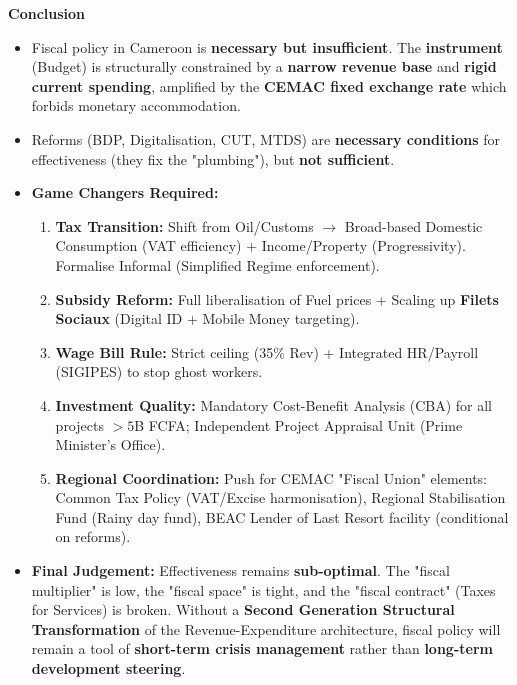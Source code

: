 \documentclass[11pt]{article}
\begin{document}
\begin{exoresolu}
\textbf{Conclusion}
\begin{itemize}
    \item Fiscal policy in Cameroon is \textbf{necessary but insufficient}. The \textbf{instrument} (Budget) is structurally constrained by a \textbf{narrow revenue base} and \textbf{rigid current spending}, amplified by the \textbf{CEMAC fixed exchange rate} which forbids monetary accommodation.
    \item Reforms (BDP, Digitalisation, CUT, MTDS) are \textbf{necessary conditions} for effectiveness (they fix the "plumbing"), but \textbf{not sufficient}. 
    \item \textbf{Game Changers Required:} 
    \begin{enumerate}
        \item \textbf{Tax Transition:} Shift from Oil/Customs $\rightarrow$ Broad-based Domestic Consumption (VAT efficiency) + Income/Property (Progressivity). Formalise Informal (Simplified Regime enforcement).
        \item \textbf{Subsidy Reform:} Full liberalisation of Fuel prices + Scaling up \textbf{Filets Sociaux} (Digital ID + Mobile Money targeting).
        \item \textbf{Wage Bill Rule:} Strict ceiling (35\% Rev) + Integrated HR/Payroll (SIGIPES) to stop ghost workers.
        \item \textbf{Investment Quality:} Mandatory Cost-Benefit Analysis (CBA) for all projects $> 5$B FCFA; Independent Project Appraisal Unit (Prime Minister's Office).
        \item \textbf{Regional Coordination:} Push for CEMAC "Fiscal Union" elements: Common Tax Policy (VAT/Excise harmonisation), Regional Stabilisation Fund (Rainy day fund), BEAC Lender of Last Resort facility (conditional on reforms).
    \end{enumerate}
    \item \textbf{Final Judgement:} Effectiveness remains \textbf{sub-optimal}. The "fiscal multiplier" is low, the "fiscal space" is tight, and the "fiscal contract" (Taxes for Services) is broken. Without a \textbf{Second Generation Structural Transformation} of the Revenue-Expenditure architecture, fiscal policy will remain a tool of \textbf{short-term crisis management} rather than \textbf{long-term development steering}.
\end{itemize}


\end{exoresolu}
\end{document}
